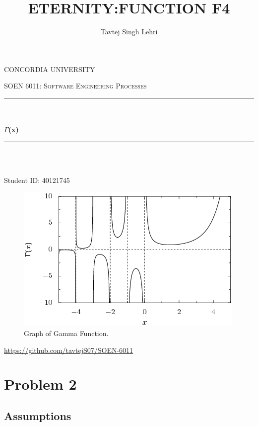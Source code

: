 \documentclass[12pt]{report}
\title{ETERNITY:FUNCTION F4}
\author{Tavtej Singh Lehri}
\date{}
\makeatletter
\let\thetitle\@title
\let\theauthor\@author
\makeatother
\begin{document}
\begin{titlepage}
\centering
\vspace*{0.5 cm}

\begin{center}
\textsc{\Large CONCORDIA UNIVERSITY}\\ [2.0 cm]    
\end{center}

\textsc{\large SOEN 6011: Software Engineering Processes}\\[0.5 cm]
\rule{\linewidth}{0.2 mm}\\[0.4 cm]
{\LARGE \textbf \thetitle}\\[0.2 cm]
{\LARGE \textbf{$\Gamma$(x)}}
\rule{\linewidth}{0.2 mm}\\[1.5 cm]

\begin{center}
    {\Large \textbf{\theauthor}}\\[0.2 cm]
    {\large Student ID: 40121745}\\[2.0 cm]
    
    \begin{figure}[h!]
    \begin{center}
    \includegraphics[width=0.5\linewidth]{Gamma_function.png}
    \end{center}
    \caption{Graph of Gamma Function.\cite{gamma}}
    \end{figure}
    
    {\large \url{https://github.com/tavtejS07/SOEN-6011}}
\end{center}

\end{titlepage}

\tableofcontents
\pagebreak

\renewcommand{\thesection}{\arabic{section}}
\section{Problem 2}
\subsection{Assumptions}
\end{document}
